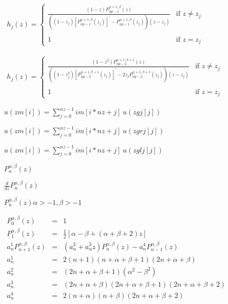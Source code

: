 \documentclass{article}
\begin{document}
$ \begin{array}{rcl}
h_j(z) = \left\{ \begin{array}{ll}
\displaystyle \frac{(1-z) P_{np-1}^{\alpha+1,\beta}(z)}
{((1-z_j) [P_{np-1}^{\alpha+1,\beta}(z_j)]^\prime -
P_{np-1}^{\alpha+1,\beta}(z_j) ) (z-z_j)} & \mbox{if $z \ne z_j$}\\
& \\
1 & \mbox{if $z=z_j$}
\end{array}
\right.
\end{array}   $
\pagebreak

$ \begin{array}{rcl}
h_j(z) = \left\{ \begin{array}{ll}
\displaystyle \frac{(1-z^2) P_{np-2}^{\alpha+1,\beta+1}(z)}
{((1-z^2_j) [P_{np-2}^{\alpha+1,\beta+1}(z_j)]^\prime -
2 z_j P_{np-2}^{\alpha+1,\beta+1}(z_j) ) (z-z_j)}&\mbox{if $z \ne z_j$}\\
& \\
1 & \mbox{if $z=z_j$}
\end{array}
\right.
\end{array}   $
\pagebreak

$
u(zm[i]) = \sum_{j=0}^{nz-1} im[i*nz+j] \ u(zgj[j])
$
\pagebreak

$ u(zm[i]) =    \sum_{j=0}^{nz-1} im[i*nz+j] \ u(zgrj[j]) $
\pagebreak

$ u(zm[i]) =    \sum_{j=0}^{nz-1} im[i*nz+j] \ u(zglj[j]) $
\pagebreak

$
       P^{\alpha,\beta}_n(z) $
\pagebreak

$
       \frac{d}{dz} P^{\alpha,\beta}_n(z) $
\pagebreak

$ P^{\alpha,\beta}_n(z) \alpha > -1, \beta > -1 $
\pagebreak

$ \begin{array}{rcl}
P^{\alpha,\beta}_0(z) &=& 1 \\
P^{\alpha,\beta}_1(z) &=& \frac{1}{2} [ \alpha-\beta+(\alpha+\beta+2)z] \\
a^1_n P^{\alpha,\beta}_{n+1}(z) &=& (a^2_n + a^3_n z)
P^{\alpha,\beta}_n(z) - a^4_n P^{\alpha,\beta}_{n-1}(z) \\
a^1_n &=& 2(n+1)(n+\alpha + \beta + 1)(2n + \alpha + \beta) \\
a^2_n &=& (2n + \alpha + \beta + 1)(\alpha^2 - \beta^2)  \\
a^3_n &=& (2n + \alpha + \beta)(2n + \alpha + \beta + 1)
(2n + \alpha + \beta + 2)  \\
a^4_n &=& 2(n+\alpha)(n+\beta)(2n + \alpha + \beta + 2)
\end{array} $
\pagebreak
\end{document}

